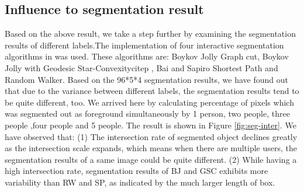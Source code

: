 \documentclass[runningheads,a4paper]{llncs}
\begin{document}
\subsection{Influence to segmentation result}
Based on the above result, we take a step further by examining the segmentation results of different labels.The implementation of four interactive segmentation algorithms in \cite{gulshan2010geodesic} was used. These algorithms are: Boykov Jolly Graph cut\cite{boykov2001interactive},  Boykov Jolly with Geodesic Star-Convexitycitep\cite{gulshan2010geodesic} , Bai and Sapiro Shortest Path\cite{bai2007geodesic} and Random Walker\cite{grady2006random}. Based on the 96*5*4 segmentation results, we have found out that due to the variance between different labels, the segmentation results tend to be quite different, too.  We arrived here by calculating percentage of pixels which was segmented out as foreground simultaneously by 1 person, two people, three people ,four people and 5 people. The result is shown in Figure \ref{fig:seg-inter}. We have observed that: (1) The intersection rate of segmented object declines greatly as the intersection scale expands, which means when there are multiple users, the segmentation results of a same image could be quite different. (2) While having a high intersection rate, segmentation results of BJ and GSC exhibits more variability than RW and SP, as indicated by the much larger length of box.

\end{document}
